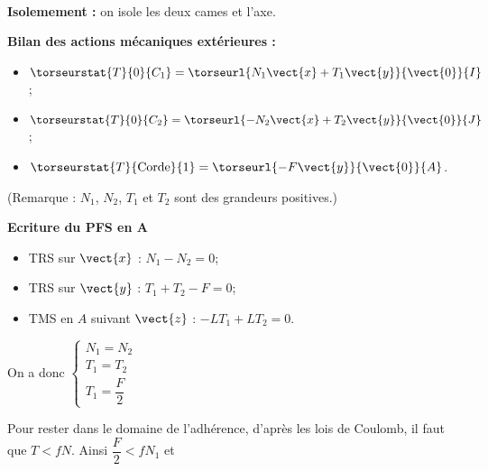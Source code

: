 \ifprof
\begin{corrige}~\\

\textbf{Isolemement : } on isole les deux cames et l'axe. 

\textbf{Bilan des actions mécaniques extérieures :}
\begin{itemize}
\item $\torseurstat{T}{0}{C_1} = \torseurl{N_1 \vect{x} + T_1 \vect{y}}{\vect{0}}{I}$;
\item $\torseurstat{T}{0}{C_2} = \torseurl{-N_2 \vect{x} + T_2 \vect{y}}{\vect{0}}{J}$;
\item $\torseurstat{T}{\text{Corde}}{1} = \torseurl{-F\vect{y} }{\vect{0}}{A}$.
\end{itemize}

(Remarque : $N_1$, $N_2$, $T_1$ et $T_2$ sont des grandeurs positives.)

\textbf{Ecriture du PFS en A}
\begin{itemize}
\item TRS sur $\vect{x}$ : $N_1 - N_2 = 0$;
\item TRS sur $\vect{y}$ : $T_1 +T _2  - F = 0$;
\item TMS en $A$ suivant $\vect{z}$ : $- L T_1 + L T_2 = 0$. 
\end{itemize}


On a donc 
$\left\{ 
\begin{array}{l}
N_1 = N_2 \\
T_1 = T_2 \\
T_1 = \dfrac{F}{2}
\end{array}
\right.$

Pour rester dans le domaine de l'adhérence, d'après les lois de Coulomb, il faut que $T< fN$. 
Ainsi $\dfrac{F}{2}< fN_1$ et 
\end{corrige}
\else
\fi


\ifprof
\begin{corrige}~\\
\end{corrige}
\else
\fi

\ifprof
\begin{corrige}~\\
\end{corrige}
\else
\fi

